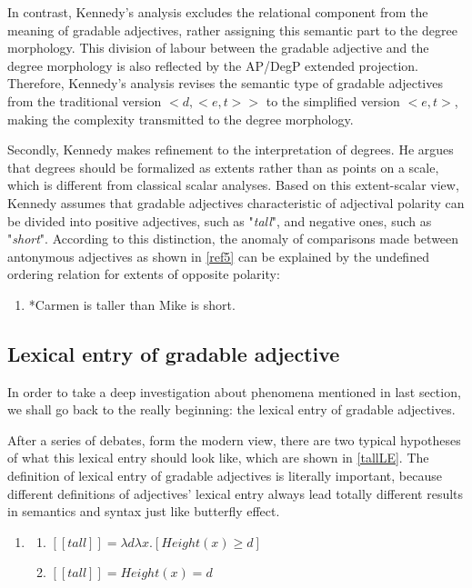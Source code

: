\documentclass{ctexart}
\let \cite \parencite
\begin{document}
In contrast, Kennedy’s analysis excludes the relational component from the meaning of gradable adjectives, rather assigning this semantic part to the degree morphology. This division of labour between the gradable adjective and the degree morphology is also reflected by the AP/DegP extended projection. Therefore, Kennedy’s analysis revises the semantic type of gradable adjectives from the traditional version $<d,<e,t>>$ to the simplified version $<e,t>$, making the complexity transmitted to the degree morphology.

Secondly, Kennedy makes refinement to the interpretation of degrees. He argues that degrees should be formalized as extents\cite{seuren1978,von1984b,bierwisch1989,lobner2010} rather than as points on a scale, which is different from classical scalar analyses. Based on this extent-scalar view, Kennedy assumes that gradable adjectives characteristic of adjectival polarity can be divided into positive adjectives, such as "\textit{tall}", and negative ones, such as "\textit{short}". According to this distinction, the anomaly of comparisons made between antonymous adjectives as shown in \ref{ref5} can be explained by the undefined ordering relation for extents of opposite polarity:

\begin{enumerate}
\item \label{ref5}
*Carmen is taller than Mike is short.
\end{enumerate}

\subsection{Lexical entry of gradable adjective}

\noindent
In order to take a deep investigation about phenomena mentioned in last section, we shall go back to the really beginning: the lexical entry of gradable adjectives. 

After a series of debates, form the modern view, there are two typical hypotheses of what this lexical entry should look like, which are shown in \ref{tallLE}. The definition of lexical entry of gradable adjectives is literally important, because different definitions of adjectives' lexical entry always lead totally different results in semantics and syntax just like butterfly effect.

\begin{enumerate}
    \item \label{tallLE}
    
    \begin{enumerate}
        \item \label{tallLE_a} 
        $[\![tall]\!]=\lambda d \lambda x.[Height(x) \geq d]$
    
        \item \label{tallLE_b} 
        $[\![tall]\!]=Height(x)=d$
    
    \end{enumerate}
\end{enumerate}
\end{document}
